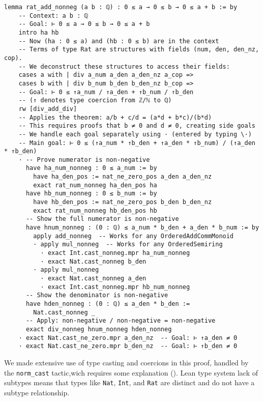 \begin{example}
\begin{lstlisting}[language=lean]
  lemma rat_add_nonneg (a b : ℚ) : 0 ≤ a → 0 ≤ b → 0 ≤ a + b := by
    -- Context: a b : ℚ
    -- Goal: ⊢ 0 ≤ a → 0 ≤ b → 0 ≤ a + b
    intro ha hb
    -- Now (ha : 0 ≤ a) and (hb : 0 ≤ b) are in the context
    -- Terms of type Rat are structures with fields (num, den, den_nz, cop).
    -- We deconstruct these structures to access their fields:
    cases a with | div a_num a_den a_den_nz a_cop =>
    cases b with | div b_num b_den b_den_nz b_cop =>
    -- Goal: ⊢ 0 ≤ ↑a_num / ↑a_den + ↑b_num / ↑b_den
    -- (↑ denotes type coercion from ℤ/ℕ to ℚ)
    rw [div_add_div]
    -- Applies the theorem: a/b + c/d = (a*d + b*c)/(b*d)
    -- This requires proofs that b ≠ 0 and d ≠ 0, creating side goals
    -- We handle each goal separately using · (entered by typing \·)
    -- Main goal: ⊢ 0 ≤ (↑a_num * ↑b_den + ↑a_den * ↑b_num) / (↑a_den * ↑b_den)
    · -- Prove numerator is non-negative
      have ha_num_nonneg : 0 ≤ a_num := by
        have ha_den_pos := nat_ne_zero_pos a_den a_den_nz
        exact rat_num_nonneg ha_den_pos ha
      have hb_num_nonneg : 0 ≤ b_num := by
        have hb_den_pos := nat_ne_zero_pos b_den b_den_nz
        exact rat_num_nonneg hb_den_pos hb
      -- Show the full numerator is non-negative
      have hnum_nonneg : (0 : ℚ) ≤ a_num * b_den + a_den * b_num := by
        apply add_nonneg  -- Works for any OrderedAddCommMonoid
        · apply mul_nonneg  -- Works for any OrderedSemiring
          · exact Int.cast_nonneg.mpr ha_num_nonneg
          · exact Nat.cast_nonneg b_den
        · apply mul_nonneg
          · exact Nat.cast_nonneg a_den
          · exact Int.cast_nonneg.mpr hb_num_nonneg
      -- Show the denominator is non-negative
      have hden_nonneg : (0 : ℚ) ≤ a_den * b_den := 
        Nat.cast_nonneg _
      -- Apply: non-negative / non-negative = non-negative
      exact div_nonneg hnum_nonneg hden_nonneg
    · exact Nat.cast_ne_zero.mpr a_den_nz  -- Goal: ⊢ ↑a_den ≠ 0
    · exact Nat.cast_ne_zero.mpr b_den_nz  -- Goal: ⊢ ↑b_den ≠ 0
\end{lstlisting}
\end{example}
We made extensive use of type casting and coercions in this proof, handled by 
the \lstinline[language=lean]|norm_cast| tactic,wich requires some explanation (\cite{lewis_madelaine_simplifying_casts_coercions_2020}).
Lean type system lack of subtypes means that types like \lstinline[language=lean]|Nat|, 
\lstinline[language=lean]|Int|, and \lstinline[language=lean]|Rat|
are distinct and do not have a subtype relationship.
